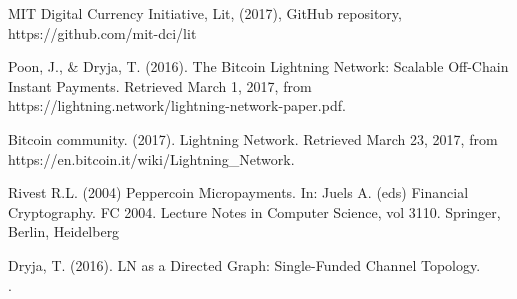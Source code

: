 \documentclass[11pt]{article}
\begin{document}

\begin{thebibliography}{99}

 MIT Digital Currency Initiative, Lit, (2017), GitHub repository, https://github.com/mit-dci/lit

 Poon, J., \& Dryja, T. (2016). The Bitcoin Lightning Network: Scalable Off-Chain Instant Payments. Retrieved March 1, 2017, from https://lightning.network/lightning-network-paper.pdf.

 Bitcoin community. (2017). Lightning Network. Retrieved March 23, 2017, from https://en.bitcoin.it/wiki/Lightning\_Network.

 Rivest R.L. (2004) Peppercoin Micropayments. In: Juels A. (eds) Financial Cryptography. FC 2004. Lecture Notes in Computer Science, vol 3110. Springer, Berlin, Heidelberg

 Dryja, T. (2016). LN as a Directed Graph: Single-Funded Channel Topology. \\
.

\end{thebibliography}
\end{document}

